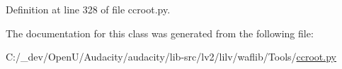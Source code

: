 Definition at line 328 of file ccroot.\+py.



The documentation for this class was generated from the following file\+:\begin{DoxyCompactItemize}
\item 
C\+:/\+\_\+dev/\+Open\+U/\+Audacity/audacity/lib-\/src/lv2/lilv/waflib/\+Tools/\hyperlink{lilv_2waflib_2_tools_2ccroot_8py}{ccroot.\+py}\end{DoxyCompactItemize}

